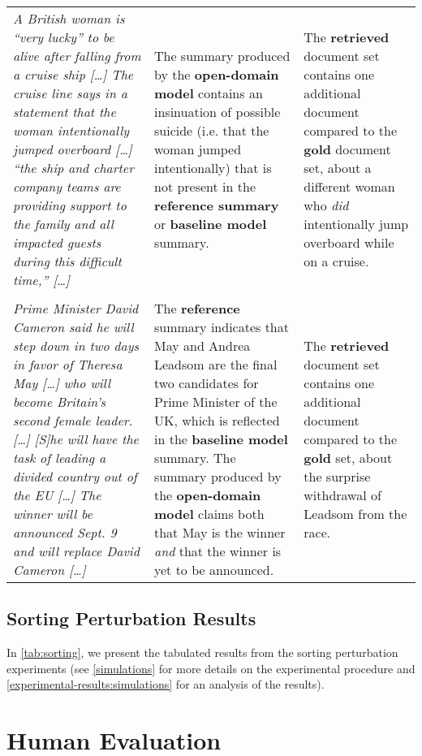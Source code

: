 \documentclass[11pt]{article}
\begin{document}
\begin{table*}[t]
\begin{tabular}{p{} p{} p{}}
		\textit{A British woman is ``very lucky'' to be alive after falling from a cruise ship […] The cruise line says in a statement that the woman intentionally jumped overboard […] ``the ship and charter company teams are providing support to the family and all impacted guests during this difficult time,'' […]} & The summary produced by the \textbf{open-domain model} contains an insinuation of possible suicide (i.e. that the woman jumped intentionally) that is not present in the \textbf{reference summary} or \textbf{baseline model} summary. & The \textbf{retrieved} document set contains one additional document compared to the \textbf{gold} document set, about a different woman who \textit{did} intentionally jump overboard while on a cruise. \\  \\
        \textit{Prime Minister David Cameron said he will step down in two days in favor of Theresa May […] who will become Britain's second female leader. […] [S]he will have the task of leading a divided country out of the EU […] The winner will be announced Sept. 9 and will replace David Cameron […]} & The \textbf{reference} summary indicates that May and Andrea Leadsom are the final two candidates for Prime Minister of the UK, which is reflected in the \textbf{baseline model} summary. The summary produced by the \textbf{open-domain model} claims both that May is the winner \textit{and} that the winner is yet to be announced. & The \textbf{retrieved} document set contains one additional document compared to the \textbf{gold} set, about the surprise withdrawal of Leadsom from the race. \\ \bottomrule
	\end{tabular}
\end{table*}

\subsection{Sorting Perturbation Results}
\label{appendix:sorting}

In \autoref{tab:sorting}, we present the tabulated results from the sorting perturbation experiments (see \textsection \ref{simulations} for more details on the experimental procedure and \textsection \ref{experimental-results:simulations} for an analysis of the results).

\section{Human Evaluation} \label{appendix:human-eval}
\end{document}
